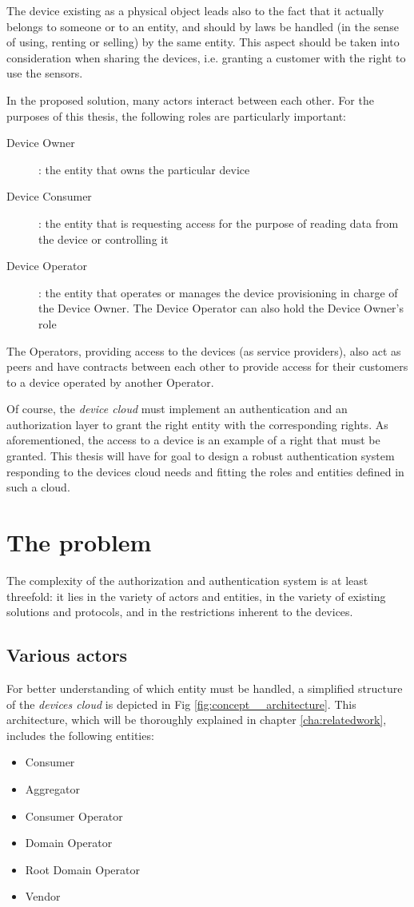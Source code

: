 The device existing as a physical object leads also to the fact that it actually belongs to someone or to an entity, and should by laws be handled (in the sense of using, renting or selling) by the same entity. This aspect should be taken into consideration when sharing the devices, i.e. granting a customer with the right to use the sensors.

In the proposed solution, many actors interact between each other. For the purposes of this thesis, the following roles are particularly important:

\begin{description}
	\item[Device Owner]: the entity that owns the particular device
	\item[Device Consumer]: the entity that is requesting access for the purpose of reading data from the device or controlling it
	\item[Device Operator]: the entity that operates or manages the device provisioning in charge of the Device Owner. The Device Operator can also hold the Device Owner's role
\end{description}

The Operators, providing access to the devices (as service providers), also act as peers and have contracts between each other to provide access for their customers to a device operated by another Operator.

Of course, the \emph{device cloud} must implement an authentication and an authorization layer to grant the right entity with the corresponding rights. As aforementioned, the access to a device is an example of a right that must be granted. This thesis will have for goal to design a robust authentication system responding to the devices cloud needs and fitting the roles and entities defined in such a cloud. 


\section{The problem}
The complexity of the authorization and authentication system is at least threefold: it lies in the variety of actors and entities, in the variety of existing solutions and protocols, and in the restrictions inherent to the devices.

\subsection{Various actors} 
For better understanding of which entity must be handled, a simplified structure of the \emph{devices cloud} is depicted in Fig \ref*{fig:concept__architecture}. This architecture, which will be thoroughly explained in chapter \ref{cha:relatedwork}, includes the following entities:
\begin{itemize}
	\item Consumer
	\item Aggregator
	\item Consumer Operator
	\item Domain Operator
	\item Root Domain Operator
	\item Vendor
\end{itemize}

